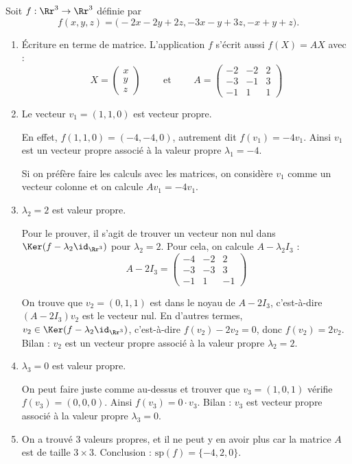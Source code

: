 \documentclass[12pt, class=report,crop=false]{standalone}
\newcommand{\Sp}{\text{sp}}
\begin{document}
\begin{exemple}
\label{ex:diagon1}
Soit $f : \Rr^3 \to \Rr^3$ définie par 
$$f(x,y,z) = \big(
-2x-2y+ 2z, 
-3x-y+3z,
-x+y+z\big).$$

\begin{enumerate}
  \item \'Ecriture en terme de matrice. L'application $f$ s'écrit aussi
  $f(X)=AX$ avec :
$$
X = \begin{pmatrix}
x\\y\\z
\end{pmatrix}
\qquad \text { et } \qquad 
A = \begin{pmatrix}
-2 & -2 & 2 \\
-3 & -1 & 3 \\
-1 & 1 & 1
\end{pmatrix}$$
  
  
  \item Le vecteur $v_1 = (1,1,0)$ est vecteur propre.
  
  En effet, $f(1,1,0) = (-4,-4,0)$, autrement dit $f(v_1) = -4 v_1$. Ainsi $v_1$ est un vecteur propre associé à la valeur propre $\lambda_1 = -4$.
  
  Si on préfère faire les calculs avec les matrices, on considère $v_1$ comme un vecteur colonne et on calcule $Av_1 = -4v_1$.
  
  \item $\lambda_2 = 2$ est valeur propre.
  
  Pour le prouver, il s'agit de trouver un vecteur non nul dans $\Ker(f-\lambda_2 \id_{\Rr^3})$ pour $\lambda_2=2$.
  Pour cela, on calcule $A - \lambda_2 I_3$ :
  $$A-2I_3 =\begin{pmatrix}
-4 & -2 & 2 \\
-3 & -3 & 3 \\
-1 & 1 & -1
\end{pmatrix}$$
  
  On trouve que $v_2 = (0,1,1)$ est dans le noyau de $A-2I_3$, c'est-à-dire
  $(A-2I_3)v_2$ est le vecteur nul. En d'autres termes, $v_2 \in \Ker(f-\lambda_2 \id_{\Rr^3})$,
  c'est-à-dire $f(v_2) - 2v_2 = 0$, donc $f(v_2) = 2v_2$. Bilan : $v_2$ est un vecteur propre associé à la valeur propre $\lambda_2 = 2$.
  
  \item $\lambda_3 = 0$ est valeur propre.
  
  On peut faire juste comme au-dessus et trouver que $v_3 = (1,0,1)$ vérifie  $f(v_3)=(0,0,0)$.
  Ainsi $f(v_3) = 0 \cdot v_3$. Bilan :  $v_3$ est vecteur propre associé à la valeur propre $\lambda_3 = 0$.
  
  \item On a trouvé $3$ valeurs propres, et il ne peut y en avoir plus car la matrice $A$ est de taille $3\times 3$. Conclusion : $\Sp(f) = \{-4,2,0\}$.

\end{enumerate}
\end{exemple}
\end{document}

